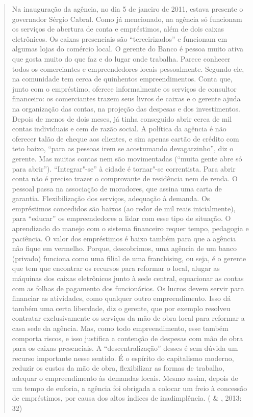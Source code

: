 \begin{quote}
Na inauguração da agência, no dia 5 de janeiro de 2011, estava presente
o governador Sérgio Cabral. Como já mencionado, na agência só funcionam
os serviços de abertura de conta e empréstimos, além de dois caixas
eletrônicos. Os caixas presenciais são ``terceirizados'' e funcionam em
algumas lojas do comércio local. O gerente do Banco é pessoa muito ativa
que gosta muito do que faz e do lugar onde trabalha. Parece conhecer
todos os comerciantes e empreendedores locais pessoalmente. Segundo ele,
na comunidade tem cerca de quinhentos empreendimentos. Conta que, junto
com o empréstimo, oferece informalmente os serviços de consultor
financeiro: os comerciantes trazem seus livros de caixas e o gerente
ajuda na organização das contas, na projeção das despesas e dos
investimentos. Depois de menos de dois meses, já tinha conseguido abrir
cerca de mil contas individuais e cem de razão social. A política da
agência é não oferecer talão de cheque aos clientes, e sim apenas cartão
de crédito com teto baixo, ``para as pessoas irem se acostumando
devagarzinho'', diz o gerente. Mas muitas contas nem são movimentadas
(``muita gente abre só para abrir''). ``Integrar"-se'' à cidade é
tornar"-se correntista. Para abrir conta não é preciso trazer o
comprovante de residência nem de renda. O pessoal passa na associação de
moradores, que assina uma carta de garantia. Flexibilização dos
serviços, adequação à demanda. Os empréstimos concedidos são baixos (ao
redor de mil reais inicialmente), para ``educar'' os empreendedores a
lidar com esse tipo de situação. O aprendizado do manejo com o sistema
financeiro requer tempo, pedagogia e paciência. O valor dos empréstimos
é baixo também para que a agência não fique em vermelho. Porque,
descobrimos, uma agência de um banco (privado) funciona como uma filial
de uma franchising, ou seja, é o gerente que tem que encontrar os
recursos para reformar o local, alugar as máquinas dos caixas
eletrônicos junto à sede central, equacionar as contas com as folhas de
pagamento dos funcionários. Os lucros devem servir para financiar as
atividades, como qualquer outro empreendimento. Isso dá também uma certa
liberdade, diz o gerente, que por exemplo resolveu contratar
exclusivamente os serviços da mão de obra local para reformar a casa
sede da agência. Mas, como todo empreendimento, esse também comporta
riscos, e isso justifica a contenção de despesas com mão de obra para os
caixas presenciais. A ``descentralização'' desses é sem dúvida um
recurso importante nesse sentido. É o espírito do capitalismo moderno,
reduzir os custos da mão de obra, flexibilizar as formas de trabalho,
adequar o empreendimento às demandas locais. Mesmo assim, depois de um
tempo de euforia, a agência foi obrigada a colocar um freio à concessão
de empréstimos, por causa dos altos índices de inadimplência. (
\& , 2013: 32)
\end{quote}

